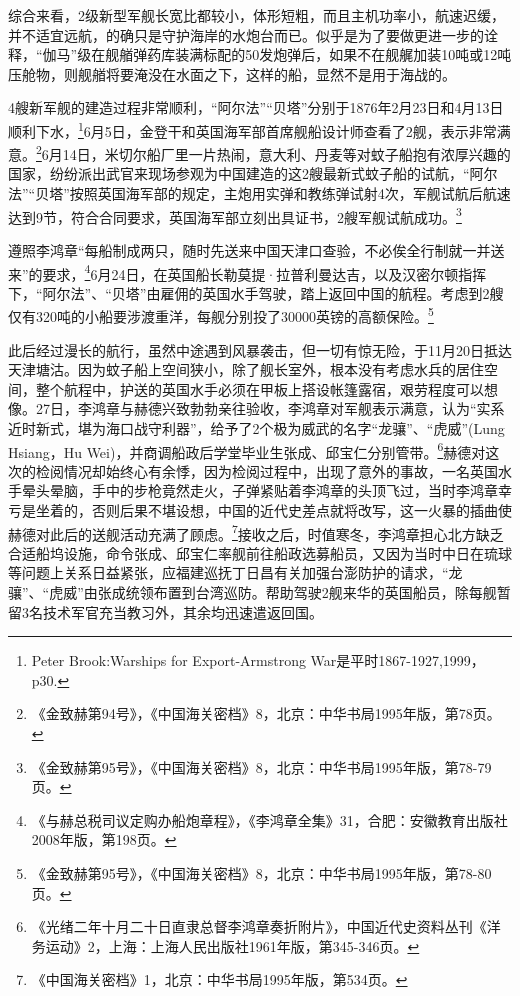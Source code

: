 \documentclass[12pt,UTF8]{ctexbook}
\begin{document}
综合来看，2级新型军舰长宽比都较小，体形短粗，而且主机功率小，航速迟缓，并不适宜远航，的确只是守护海岸的水炮台而已。似乎是为了要做更进一步的诠释，“伽马”级在舰艏弹药库装满标配的50发炮弹后，如果不在舰艉加装10吨或12吨压舱物，则舰艏将要淹没在水面之下，这样的船，显然不是用于海战的。

4艘新军舰的建造过程非常顺利，“阿尔法”“贝塔”分别于1876年2月23日和4月13日顺利下水，\footnote{Peter Brook:Warships for Export-Armstrong War是平时1867-1927,1999，p30.}6月5日，金登干和英国海军部首席舰船设计师查看了2舰，表示非常满意。\footnote{《金致赫第94号》，《中国海关密档》8，北京：中华书局1995年版，第78页。}6月14日，米切尔船厂里一片热闹，意大利、丹麦等对蚊子船抱有浓厚兴趣的国家，纷纷派出武官来现场参观为中国建造的这2艘最新式蚊子船的试航，“阿尔法”“贝塔”按照英国海军部的规定，主炮用实弹和教练弹试射4次，军舰试航后航速达到9节，符合合同要求，英国海军部立刻出具证书，2艘军舰试航成功。\footnote{《金致赫第95号》，《中国海关密档》8，北京：中华书局1995年版，第78-79页。}

遵照李鸿章“每船制成两只，随时先送来中国天津口查验，不必俟全行制就一并送来”的要求，\footnote{《与赫总税司议定购办船炮章程》，《李鸿章全集》31，合肥：安徽教育出版社2008年版，第198页。}6月24日，在英国船长勒莫提·拉普利曼达吉，以及汉密尔顿指挥下，“阿尔法”、“贝塔”由雇佣的英国水手驾驶，踏上返回中国的航程。考虑到2艘仅有320吨的小船要涉渡重洋，每舰分别投了30000英镑的高额保险。\footnote{《金致赫第95号》，《中国海关密档》8，北京：中华书局1995年版，第78-80页。}

此后经过漫长的航行，虽然中途遇到风暴袭击，但一切有惊无险，于11月20日抵达天津塘沽。因为蚊子船上空间狭小，除了舰长室外，根本没有考虑水兵的居住空间，整个航程中，护送的英国水手必须在甲板上搭设帐篷露宿，艰劳程度可以想像。27日，李鸿章与赫德兴致勃勃亲往验收，李鸿章对军舰表示满意，认为“实系近时新式，堪为海口战守利器”，给予了2个极为威武的名字“龙骧”、“虎威”(Lung Hsiang，Hu Wei)，并商调船政后学堂毕业生张成、邱宝仁分别管带。\footnote{《光绪二年十月二十日直隶总督李鸿章奏折附片》，中国近代史资料丛刊《洋务运动》2，上海：上海人民出版社1961年版，第345-346页。}赫德对这次的检阅情况却始终心有余悸，因为检阅过程中，出现了意外的事故，一名英国水手晕头晕脑，手中的步枪竟然走火，子弹紧贴着李鸿章的头顶飞过，当时李鸿章幸亏是坐着的，否则后果不堪设想，中国的近代史差点就将改写，这一火暴的插曲使赫德对此后的送舰活动充满了顾虑。\footnote{《中国海关密档》1，北京：中华书局1995年版，第534页。}接收之后，时值寒冬，李鸿章担心北方缺乏合适船坞设施，命令张成、邱宝仁率舰前往船政选募船员，又因为当时中日在琉球等问题上关系日益紧张，应福建巡抚丁日昌有关加强台澎防护的请求，“龙骧”、“虎威”由张成统领布置到台湾巡防。帮助驾驶2舰来华的英国船员，除每舰暂留3名技术军官充当教习外，其余均迅速遣返回国。
\end{document}
